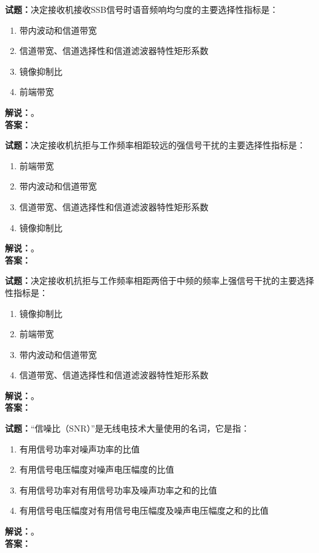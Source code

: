 \documentclass{ctexbook}
\begin{document}
\bigskip

\noindent\textbf{试题：}决定接收机接收SSB信号时语音频响均匀度的主要选择性指标是：
\begin{enumerate}[leftmargin=3em]
  \item 带内波动和信道带宽
  \item 信道带宽、信道选择性和信道滤波器特性矩形系数
  \item 镜像抑制比
  \item 前端带宽
\end{enumerate}
\noindent\textbf{解说：}\textbf{}。\\\noindent\textbf{答案：}

\bigskip

\noindent\textbf{试题：}决定接收机抗拒与工作频率相距较远的强信号干扰的主要选择性指标是：
\begin{enumerate}[leftmargin=3em]
  \item 前端带宽
  \item 带内波动和信道带宽
  \item 信道带宽、信道选择性和信道滤波器特性矩形系数
  \item 镜像抑制比
\end{enumerate}
\noindent\textbf{解说：}\textbf{}。\\\noindent\textbf{答案：}

\bigskip

\noindent\textbf{试题：}决定接收机抗拒与工作频率相距两倍于中频的频率上强信号干扰的主要选择性指标是：
\begin{enumerate}[leftmargin=3em]
  \item 镜像抑制比
  \item 前端带宽
  \item 带内波动和信道带宽
  \item 信道带宽、信道选择性和信道滤波器特性矩形系数
\end{enumerate}
\noindent\textbf{解说：}\textbf{}。\\\noindent\textbf{答案：}

\bigskip

\noindent\textbf{试题：}“信噪比（SNR）”是无线电技术大量使用的名词，它是指：
\begin{enumerate}[leftmargin=3em]
  \item 有用信号功率对噪声功率的比值
  \item 有用信号电压幅度对噪声电压幅度的比值
  \item 有用信号功率对有用信号功率及噪声功率之和的比值
  \item 有用信号电压幅度对有用信号电压幅度及噪声电压幅度之和的比值
\end{enumerate}
\noindent\textbf{解说：}\textbf{}。\\\noindent\textbf{答案：}
\end{document}
